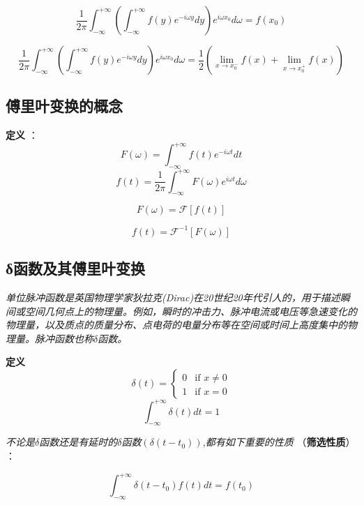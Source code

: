\qquad \qquad {}

\[\frac{1}{2\pi}\int_{-\infty}^{+\infty}(\int_{-\infty}^{+\infty}f(y)e^{-i\omega y}dy)e^{i\omega x_0}d\omega=f(x_0)\]

\[\frac{1}{2\pi}\int_{-\infty}^{+\infty}(\int_{-\infty}^{+\infty}f(y)e^{-i\omega y}dy)e^{i\omega x_0}d\omega=\frac{1}{2}\left ( \lim_{x \rightarrow x_0^-}{f(x)}+\lim_{x \rightarrow x_0^+}{f(x)} \right )\]

\subsection{傅里叶变换的概念}

\textbf{定义}  ：
\[F(\omega)=\int_{-\infty}^{+\infty}f(t)e^{-i\omega t}dt \tag{1}\] 
\[f(t)=\frac{1}{2\pi}\int_{-\infty}^{+\infty}F(\omega)e^{i\omega t}d\omega \tag{2}\]

\[F(\omega)=\mathcal{F}[f(t)]\]

\[f(t)=\mathcal{F}^{-1}[F(\omega)]\]

\subsection{δ函数及其傅里叶变换}

\textit{单位脉冲函数是英国物理学家狄拉克(Dirac)在20世纪20年代引人的，用于描述瞬间或空间几何点上的物理量。例如，瞬时的冲击力、脉冲电流或电压等急速变化的物理量，以及质点的质量分布、点电荷的电量分布等在空间或时间上高度集中的物理量。脉冲函数也称$\delta$函数。}

\textbf{定义} \qquad {}
\[\delta(t)=\left\{
\begin{array}{rl}
0 & \text{if } x \neq 0\\
1 & \text{if } x=0
\end{array} \right. \tag{1}\]
\[\int_{-\infty}^{+\infty}\delta(t)dt=1 \tag{2}\]

\textit{不论是$\delta$函数还是有延时的$\delta$函数$(\delta(t-t_0))$,都有如下重要的性质} （\textbf{筛选性质}） ：

\[\int_{-\infty}^{+\infty}\delta(t-t_0)f(t)dt=f(t_0) \tag{k}\]

